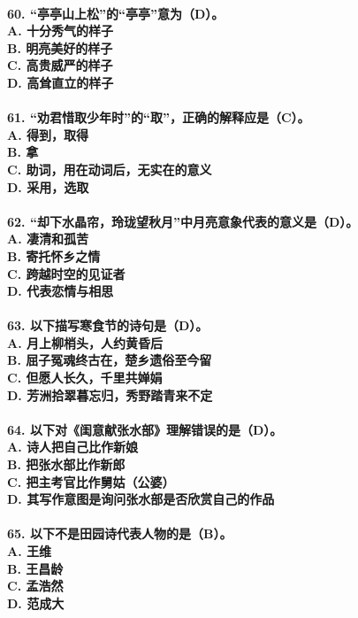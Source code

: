 \documentclass[UTF8]{ctexart} %
\begin{document}
\paragraph{
60. “亭亭山上松”的“亭亭”意为（\color{red}D\color{black}）。 \\
    A. 十分秀气的样子 \\
    B. 明亮美好的样子 \\
    C. 高贵威严的样子 \\
    D. 高耸直立的样子
}
\paragraph{
61. “劝君惜取少年时”的“取”，正确的解释应是（\color{red}C\color{black}）。 \\
    A. 得到，取得 \\
    B. 拿 \\
    C. 助词，用在动词后，无实在的意义 \\
    D. 采用，选取
}
\paragraph{
62. “却下水晶帘，玲珑望秋月”中月亮意象代表的意义是（\color{red}D\color{black}）。 \\
    A. 凄清和孤苦 \\
    B. 寄托怀乡之情 \\
    C. 跨越时空的见证者 \\
    D. 代表恋情与相思
}
\paragraph{
63. 以下描写寒食节的诗句是（\color{red}D\color{black}）。 \\
    A. 月上柳梢头，人约黄昏后 \\
    B. 屈子冤魂终古在，楚乡遗俗至今留 \\
    C. 但愿人长久，千里共婵娟 \\
    D. 芳洲拾翠暮忘归，秀野踏青来不定
}
\paragraph{
64. 以下对《闺意献张水部》理解错误的是（\color{red}D\color{black}）。 \\
    A. 诗人把自己比作新娘 \\
    B. 把张水部比作新郎 \\
    C. 把主考官比作舅姑（公婆） \\
    D. 其写作意图是询问张水部是否欣赏自己的作品
}
\paragraph{
65. 以下不是田园诗代表人物的是（\color{red}B\color{black}）。 \\
    A. 王维 \\
    B. 王昌龄 \\
    C. 孟浩然 \\
    D. 范成大
}
\end{document}
